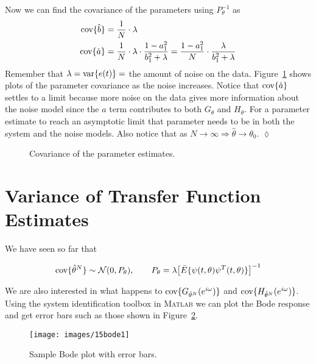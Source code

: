 \begin{example}
Now we can find the covariance of the parameters using $P_\theta^{-1}$ as
\begin{align*}
\text{cov}\{\hat{b}\} &= \frac{1}{N}\cdot\lambda \\
\text{cov}\{\hat{a}\} &= \frac{1}{N}\cdot\lambda\cdot\frac{1-a_1^2}{b_1^2+\lambda} = \frac{1-a_1^2}{N}\cdot\frac{\lambda}{b_1^2+\lambda}
\end{align*}
Remember that $\lambda = \text{var}\{e(t)\} = $ the amount of noise on the data.
Figure~\ref{fig:15cov} shows plots of the parameter covariance as the noise increases.
Notice that $\text{cov}\{\hat{a}\}$ settles to a limit because more noise on the data gives more information about the noise model since the $a$ term contributes to both $G_\theta$ and $H_\theta$.
For a parameter estimate to reach an asymptotic limit that parameter needs to be in both the system and the noise models.
Also notice that as $N\to\infty \Rightarrow \hat{\theta}\to\theta_0$.
$\lozenge$
\end{example}

\begin{figure}[ht!]
\centering
{} \hfill
{}
\caption{Covariance of the parameter estimates.}%
\label{fig:15cov}
\end{figure}

\section{Variance of Transfer Function Estimates}
We have seen so far that

\begin{equation*}
\text{cov}\{\hat{\theta}^N\}\sim\mathcal{N}(0,P_\theta), \qquad P_\theta = \lambda{\left[\bar{E}\{\psi(t,\theta)\psi^T(t,\theta)\}\right]}^{-1}
\end{equation*}

We are also interested in what happens to $\text{cov}\{G_{\hat{\theta}^N}(e^{i\omega})\}$ and $\text{cov}\{H_{\hat{\theta}^N}(e^{i\omega})\}$.
Using the system identification toolbox in \textsc{Matlab} we can plot the Bode response and get error bars such as those shown in Figure~\ref{fig:15bode1}.

\begin{figure}[ht!]
\centering
\texttt{[image: images/15bode1]}
\caption{Sample Bode plot with error bars.}%
\label{fig:15bode1}
\end{figure}


